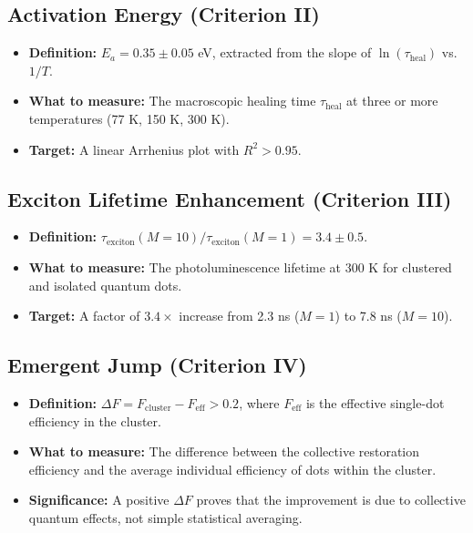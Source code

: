 \documentclass[12pt]{article}
\begin{document}
\subsection{Activation Energy (Criterion II)}
\begin{itemize}
    \item \textbf{Definition:} $E_a = 0.35 \pm 0.05$ eV, extracted from the slope of $\ln(\tau_{\text{heal}})$ vs. $1/T$.
    \item \textbf{What to measure:} The macroscopic healing time $\tau_{\text{heal}}$ at three or more temperatures (77 K, 150 K, 300 K).
    \item \textbf{Target:} A linear Arrhenius plot with $R^2 > 0.95$.
\end{itemize}

\subsection{Exciton Lifetime Enhancement (Criterion III)}
\begin{itemize}
    \item \textbf{Definition:} $\tau_{\text{exciton}}(M=10) / \tau_{\text{exciton}}(M=1) = 3.4 \pm 0.5$.
    \item \textbf{What to measure:} The photoluminescence lifetime at 300 K for clustered and isolated quantum dots.
    \item \textbf{Target:} A factor of $3.4\times$ increase from 2.3 ns ($M=1$) to 7.8 ns ($M=10$).
\end{itemize}

\subsection{Emergent Jump (Criterion IV)}
\begin{itemize}
    \item \textbf{Definition:} $\Delta F = F_{\text{cluster}} - F_{\text{eff}} > 0.2$, where $F_{\text{eff}}$ is the effective single-dot efficiency in the cluster.
    \item \textbf{What to measure:} The difference between the collective restoration efficiency and the average individual efficiency of dots within the cluster.
    \item \textbf{Significance:} A positive $\Delta F$ proves that the improvement is due to collective quantum effects, not simple statistical averaging.
\end{itemize}
\end{document}
